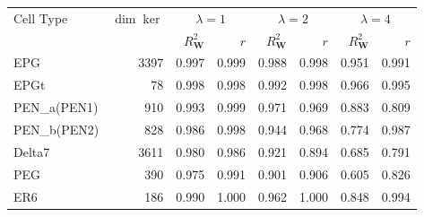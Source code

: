 \begin{tabular}{lrrrrrrr}
\toprule
Cell Type & $\dim\ker$ & \multicolumn{2}{c}{$\lambda = 1$} & \multicolumn{2}{c}{$\lambda = 2$} & \multicolumn{2}{c}{$\lambda = 4$} \\
 & & $R^2_{\mathbf{W}}$ & $r$ & $R^2_{\mathbf{W}}$ & $r$ & $R^2_{\mathbf{W}}$ & $r$ \\
\midrule
EPG            & 3397 & 0.997 & 0.999 & 0.988 & 0.998 & 0.951 & 0.991 \\
EPGt           &   78 & 0.998 & 0.998 & 0.992 & 0.998 & 0.966 & 0.995 \\
PEN\_a(PEN1)   &  910 & 0.993 & 0.999 & 0.971 & 0.969 & 0.883 & 0.809 \\
PEN\_b(PEN2)   &  828 & 0.986 & 0.998 & 0.944 & 0.968 & 0.774 & 0.987 \\
Delta7         & 3611 & 0.980 & 0.986 & 0.921 & 0.894 & 0.685 & 0.791 \\
PEG            &  390 & 0.975 & 0.991 & 0.901 & 0.906 & 0.605 & 0.826 \\
ER6            &  186 & 0.990 & 1.000 & 0.962 & 1.000 & 0.848 & 0.994 \\
\bottomrule
\end{tabular}
